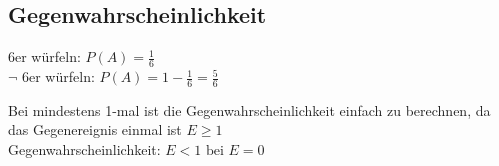 \subsection{Gegenwahrscheinlichkeit}

\hfill {} 6er würfeln: $P(A) = \frac{1}{6}$\\
$\lnot$ 6er würfeln: $P(A) = 1-\frac{1}{6} = \frac{5}{6}$

\hfill \break
Bei mindestens 1-mal ist die Gegenwahrscheinlichkeit einfach zu berechnen, da das Gegenereignis einmal ist $E \geq 1$\\
Gegenwahrscheinlichkeit: $E < 1 \textrm{ bei } E = 0$